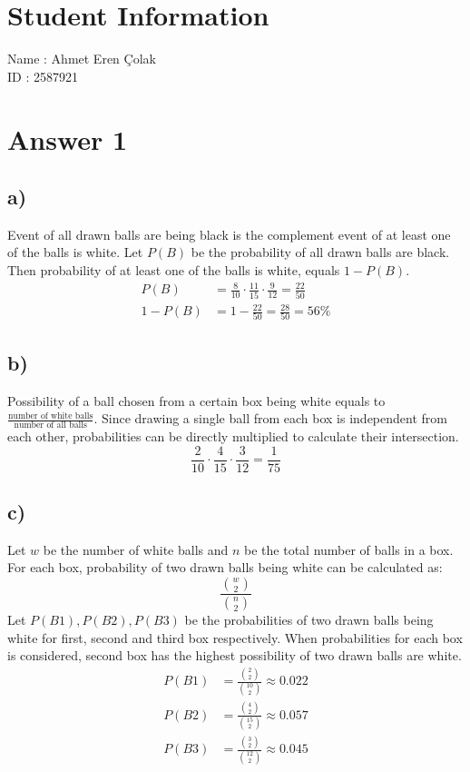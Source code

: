 \documentclass[12pt]{article}
\begin{document}
\section*{Student Information}

Name : Ahmet Eren Çolak\\

ID : 2587921\\

\section*{Answer 1}
\subsection*{a)}
Event of all drawn balls are being black is the complement event of at least one of the balls is white. Let $P(B)$ be the probability of all drawn balls are black. Then probability of at least one of the balls is white, equals $1-P(B)$.
    \begin{align*}
        P(B) &= \frac{8}{10} \cdot \frac{11}{15} \cdot \frac{9}{12} = \frac{22}{50}\\
        1 - P(B) &= 1 - \frac{22}{50} = \frac{28}{50} = 56\%
    \end{align*}
\subsection*{b)}
Possibility of a ball chosen from a certain box being white equals to $\frac{\text{number of white balls}}{\text{number of all balls}}$. Since drawing a single ball from each box is independent from each other, probabilities can be directly multiplied to calculate their intersection.
    \begin{equation*}
        \frac{2}{10} \cdot \frac{4}{15} \cdot \frac{3}{12} = \frac{1}{75}
    \end{equation*}
\subsection*{c)}
Let $w$ be the number of white balls and $n$ be the total number of balls in a box. For each box, probability of two drawn balls being white can be calculated as: \[ \frac{{w \choose 2}}{{n \choose 2}} \]
Let $P(B1), P(B2), P(B3)$ be the probabilities of two drawn balls being white for first, second and third box respectively. When probabilities for each box is considered, second box has the highest possibility of two drawn balls are white.
\begin{align*}
    P(B1) &= \frac{{2 \choose 2}}{{10 \choose 2}} \approx 0.022\\
    P(B2) &= \frac{{4 \choose 2}}{{15 \choose 2}} \approx 0.057\\
    P(B3) &= \frac{{3 \choose 2}}{{12 \choose 2}} \approx 0.045
\end{align*}
\end{document}
